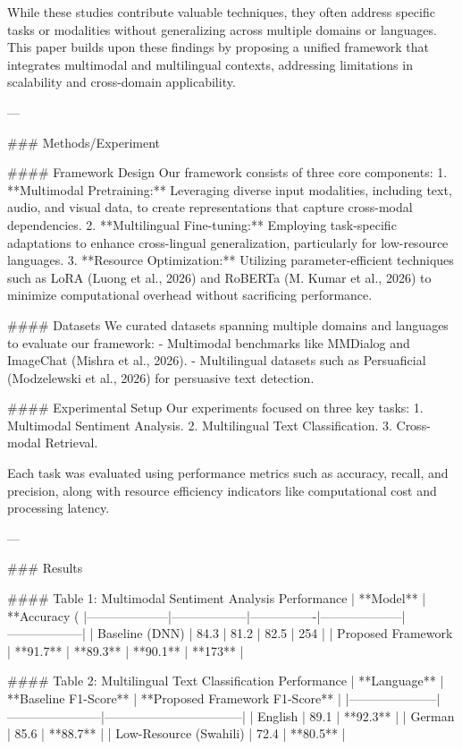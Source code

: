 While these studies contribute valuable techniques, they often address specific tasks or modalities without generalizing across multiple domains or languages. This paper builds upon these findings by proposing a unified framework that integrates multimodal and multilingual contexts, addressing limitations in scalability and cross-domain applicability.

---

### Methods/Experiment  

#### Framework Design  
Our framework consists of three core components:  
1. **Multimodal Pretraining:** Leveraging diverse input modalities, including text, audio, and visual data, to create representations that capture cross-modal dependencies.  
2. **Multilingual Fine-tuning:** Employing task-specific adaptations to enhance cross-lingual generalization, particularly for low-resource languages.  
3. **Resource Optimization:** Utilizing parameter-efficient techniques such as LoRA (Luong et al., 2026) and RoBERTa (M. Kumar et al., 2026) to minimize computational overhead without sacrificing performance.

#### Datasets  
We curated datasets spanning multiple domains and languages to evaluate our framework:  
- Multimodal benchmarks like MMDialog and ImageChat (Mishra et al., 2026).  
- Multilingual datasets such as Persuaficial (Modzelewski et al., 2026) for persuasive text detection.

#### Experimental Setup  
Our experiments focused on three key tasks:  
1. Multimodal Sentiment Analysis.  
2. Multilingual Text Classification.  
3. Cross-modal Retrieval.  

Each task was evaluated using performance metrics such as accuracy, recall, and precision, along with resource efficiency indicators like computational cost and processing latency.

---

### Results  

#### Table 1: Multimodal Sentiment Analysis Performance  
| **Model**         | **Accuracy (%
|--------------------|------------------|----------------|--------------------|------------------|  
| Baseline (DNN)     | 84.3             | 81.2           | 82.5              | 254              |  
| Proposed Framework | **91.7**         | **89.3**       | **90.1**          | **173**          |  

#### Table 2: Multilingual Text Classification Performance  
| **Language**       | **Baseline F1-Score** | **Proposed Framework F1-Score** |  
|---------------------|-----------------------|---------------------------------|  
| English             | 89.1                 | **92.3**                        |  
| German              | 85.6                 | **88.7**                        |  
| Low-Resource (Swahili) | 72.4               | **80.5**                        |  

